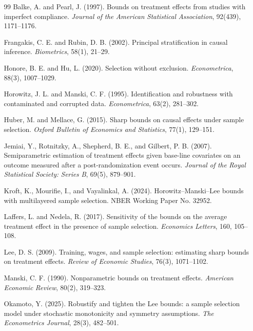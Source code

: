 \documentclass[11pt]{article}
\theoremstyle{definition}
\theoremstyle{plain}
\theoremstyle{remark}
\begin{document}
\begin{thebibliography}{99}
Balke, A. and Pearl, J. (1997).
Bounds on treatment effects from studies with imperfect compliance.
\emph{Journal of the American Statistical Association}, 92(439), 1171--1176.

Frangakis, C. E. and Rubin, D. B. (2002).
Principal stratification in causal inference.
\emph{Biometrics}, 58(1), 21--29.

Honore, B. E. and Hu, L. (2020).
Selection without exclusion.
\emph{Econometrica}, 88(3), 1007--1029.

Horowitz, J. L. and Manski, C. F. (1995).
Identification and robustness with contaminated and corrupted data.
\emph{Econometrica}, 63(2), 281--302.

Huber, M. and Mellace, G. (2015).
Sharp bounds on causal effects under sample selection.
\emph{Oxford Bulletin of Economics and Statistics}, 77(1), 129--151.

Jemiai, Y., Rotnitzky, A., Shepherd, B. E., and Gilbert, P. B. (2007).
Semiparametric estimation of treatment effects given base-line covariates on
an outcome measured after a post-randomization event occurs.
\emph{Journal of the Royal Statistical Society: Series B}, 69(5), 879--901.

Kroft, K., Mourifie, I., and Vayalinkal, A. (2024).
Horowitz--Manski--Lee bounds with multilayered sample selection.
NBER Working Paper No. 32952.

Laffers, L. and Nedela, R. (2017).
Sensitivity of the bounds on the average treatment effect in the presence of
sample selection.
\emph{Economics Letters}, 160, 105--108.

Lee, D. S. (2009).
Training, wages, and sample selection: estimating sharp bounds on treatment
effects.
\emph{Review of Economic Studies}, 76(3), 1071--1102.

Manski, C. F. (1990).
Nonparametric bounds on treatment effects.
\emph{American Economic Review}, 80(2), 319--323.

Okamoto, Y. (2025).
Robustify and tighten the Lee bounds: a sample selection model under stochastic
monotonicity and symmetry assumptions.
\emph{The Econometrics Journal}, 28(3), 482--501.


\end{thebibliography}
\end{document}
